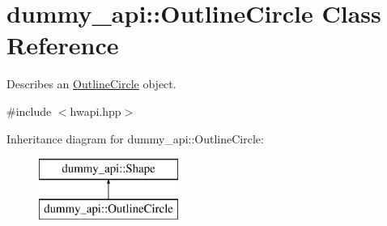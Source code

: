 \hypertarget{classdummy__api_1_1OutlineCircle}{}\section{dummy\+\_\+api\+:\+:Outline\+Circle Class Reference}
\label{classdummy__api_1_1OutlineCircle}


Describes an \mbox{\hyperlink{classdummy__api_1_1OutlineCircle}{Outline\+Circle}} object.  




{\ttfamily \#include $<$hwapi.\+hpp$>$}

Inheritance diagram for dummy\+\_\+api\+:\+:Outline\+Circle\+:\begin{figure}[H]
\begin{center}
\leavevmode
\includegraphics[height=2.000000cm]{classdummy__api_1_1OutlineCircle}
\end{center}
\end{figure}

